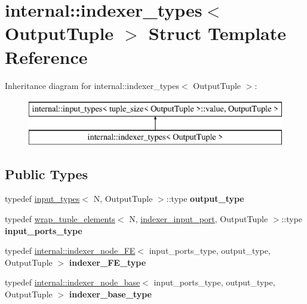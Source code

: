 \hypertarget{structinternal_1_1indexer__types}{}\section{internal\+:\+:indexer\+\_\+types$<$ Output\+Tuple $>$ Struct Template Reference}
\label{structinternal_1_1indexer__types}
Inheritance diagram for internal\+:\+:indexer\+\_\+types$<$ Output\+Tuple $>$\+:\begin{figure}[H]
\begin{center}
\leavevmode
\includegraphics[height=2.000000cm]{structinternal_1_1indexer__types}
\end{center}
\end{figure}
\subsection*{Public Types}
\begin{DoxyCompactItemize}
\item 
\hypertarget{structinternal_1_1indexer__types_a2cf9a2ade9a4edd694be6ead107f63ef}{}typedef \hyperlink{structinternal_1_1input__types}{input\+\_\+types}$<$ N, Output\+Tuple $>$\+::type {\bfseries output\+\_\+type}\label{structinternal_1_1indexer__types_a2cf9a2ade9a4edd694be6ead107f63ef}

\item 
\hypertarget{structinternal_1_1indexer__types_a8e4509334a8be8d59cb44d376684ec87}{}typedef \hyperlink{structinternal_1_1wrap__tuple__elements}{wrap\+\_\+tuple\+\_\+elements}$<$ N, \hyperlink{classinternal_1_1indexer__input__port}{indexer\+\_\+input\+\_\+port}, Output\+Tuple $>$\+::type {\bfseries input\+\_\+ports\+\_\+type}\label{structinternal_1_1indexer__types_a8e4509334a8be8d59cb44d376684ec87}

\item 
\hypertarget{structinternal_1_1indexer__types_af26a962abeccfde063fbf5506c278fb9}{}typedef \hyperlink{classinternal_1_1indexer__node__FE}{internal\+::indexer\+\_\+node\+\_\+\+F\+E}$<$ input\+\_\+ports\+\_\+type, output\+\_\+type, Output\+Tuple $>$ {\bfseries indexer\+\_\+\+F\+E\+\_\+type}\label{structinternal_1_1indexer__types_af26a962abeccfde063fbf5506c278fb9}

\item 
\hypertarget{structinternal_1_1indexer__types_affe29154dfaa483cd4bf3354068aa027}{}typedef \hyperlink{classinternal_1_1indexer__node__base}{internal\+::indexer\+\_\+node\+\_\+base}$<$ input\+\_\+ports\+\_\+type, output\+\_\+type, Output\+Tuple $>$ {\bfseries indexer\+\_\+base\+\_\+type}\label{structinternal_1_1indexer__types_affe29154dfaa483cd4bf3354068aa027}

\end{DoxyCompactItemize}
